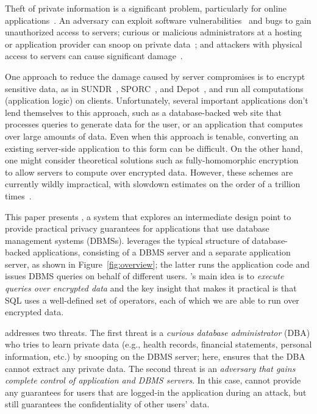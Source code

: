 Theft of private information is a significant problem, particularly
for online applications~\cite{prc:breaches}.  An adversary can exploit
software vulnerabilities~\cite{cve:stats} and bugs to
gain unauthorized access to servers; curious or malicious
administrators at a hosting or application provider can snoop on
private data~\cite{chen:gmail-snooping}; and attackers with
physical access to servers can cause significant
damage~\cite{halderman:cold-boot}.


One approach to reduce the damage caused by server compromises is to
encrypt sensitive data, as in SUNDR~\cite{li:sundr},
SPORC~\cite{feldman:sporc}, and Depot~\cite{mahajan:depot}, and run
all computations (application logic) on clients.  Unfortunately,
several important applications don't lend themselves to this approach,
such as a database-backed web site that processes queries to generate
data for the user, or an application that computes over large amounts of data.  Even when this approach is
tenable, converting an existing server-side application to this form can be
difficult.  On the other hand, one might consider theoretical solutions such as fully-homomorphic
encryption~\cite{gentry:fhe} to allow servers to compute over
encrypted data.  However, these schemes are currently wildly
impractical, with slowdown estimates on the order of a trillion
times~\cite{trillion}.

This paper presents \name{}, a system that explores an intermediate
design point to provide practical privacy guarantees for applications
that use database management systems (DBMSs).  \name leverages the
typical structure of database-backed applications, consisting of a
DBMS server and a separate application server, as shown in
Figure~\ref{fig:overview}; the latter runs the application code and
issues DBMS queries on behalf of different users.  \name's main idea
 is to {\em execute queries over encrypted data} and the key insight
that makes it practical is that SQL uses a well-defined set of
operators, each of which we are able to run over
encrypted data.

\name{} addresses two threats.  The first threat is a {\em curious
  database administrator} (DBA) who tries to learn private data (e.g.,
health records, financial statements, personal information, etc.) by
snooping on the DBMS server; here, \name ensures that the DBA cannot
extract any private data.  The second threat is an {\em adversary that
  gains complete control of application and DBMS servers}.  In this
case, \name cannot provide any guarantees for users that are logged-in the application during an attack, but still guarantees the confidentiality of
other users' data.

